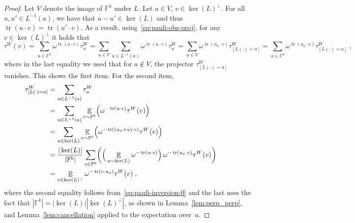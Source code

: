 \documentclass[11pt]{article}
\theoremstyle{definition}
\newcommand{\F}{\ensuremath{\mathbb{F}}}
\DeclareMathOperator{\tr}{tr}
\newcommand{\E}{\mathop{\mathbb{E}}\displaylimits} %
\begin{document}
\begin{proof}
  Let $V$ denote the image of $\F^k$ under $L$.
  Let $a\in V$, $v \in \ker(L)^\perp$.
  For all $u, u' \in L^{-1}(a)$, we have that $u-u'\in \ker(L)$ and thus $\tr(u
  \cdot v) = \tr(u' \cdot v)$.
  As a result, using~\eqref{eq:pauli-obs-proj}, for any $v\in\ker(L)^\perp$ it
  holds that
  \begin{equation*}
    \tau^W(v)
    = \sum_{u \in \F^k} \omega^{\tr(u \cdot v)} \tau^W_u
    = \sum_{a \in V} \sum_{u \in L^{-1}(a)} \omega^{\tr(u \cdot v)} \tau^W_u
    = \sum_{a \in V} \omega^{\tr(u_a \cdot v)} \tau^W_{[L(\cdot)=a]}
    = \sum_{a \in \F^k} \omega^{\tr(u_a \cdot v)} \tau^W_{[L(\cdot)=a]}\;,
  \end{equation*}
  where in the last equality we used that for $a \notin V$, the projector
  $\tau^W_{[L(\cdot)=a]}$ vanishes.
  This shows the first item.
  For the second item,
  \begin{align*}
    \tau^W_{[L(\cdot)=a]}
    & = \sum_{u  \in L^{-1}(a)} \tau^W_u\\
    & =  \sum_{u  \in L^{-1}(a)} \E_{v \sim \F^k} \Bigl(
      \omega^{-\tr(u \cdot v)} \tau^W(v) \Bigr) && \\
    & =  \sum_{u \in \ker(L)} \E_{v \sim \F^k} \Bigl(
      \omega^{-\tr((u_a + u) \cdot v)} \tau^W(v) \Bigr)\\
    & = \frac{|\ker(L)|}{|\F^k|} \sum_{v \in \F^k} \biggl( \Big(
      \E_{u \sim \ker(L)} \omega^{-\tr(u \cdot v)} \Big)\,
      \omega^{-\tr(u_a \cdot v)}  \tau^W(v) \biggr)\\
    & = \E_{v \in \ker(L)^\perp} \omega^{-\tr(v \cdot u_a)} \tau^W(v)\;,
\end{align*}
where the second equality follows from~\eqref{eq:pauli-inversion-0} and the last
uses the fact that $|\F^k|=|\ker(L)||\ker(L)^\perp|$, as shown in
Lemma~\ref{lem:perp_perp}, and Lemma~\ref{lem:cancellation} applied to the
expectation over~$u$.
\end{proof}
\end{document}

